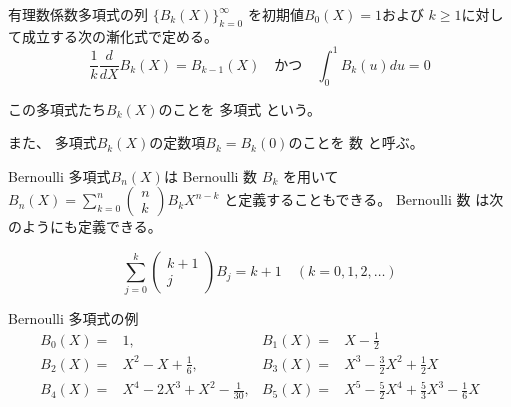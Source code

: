 \documentclass[12pt,b5paper]{ltjsarticle}
\begin{document}
有理数係数多項式の列
$\{ B_{k}(X) \}_{k=0}^{\infty}$
を初期値$B_{0}(X)=1$および
$k\geq 1$に対して成立する次の漸化式で定める。
\begin{equation}
 \frac{1}{k}\frac{d}{dX}B_{k}(X) = B_{k-1}(X)
  \quad かつ \quad
  \int_{0}^{1} B_{k}(u)du=0
\end{equation}

この多項式たち$B_{k}(X)$のことを
 多項式
という。

また、
多項式$B_{k}(X)$の定数項$B_{k}=B_{k}(0)$のことを
 数
と呼ぶ。


Bernoulli 多項式$B_{n}(X)$は
Bernoulli 数
$B_{k}$
を用いて
$B_{n}(X) = \sum_{k=0}^{n}\begin{pmatrix}n \\ k\end{pmatrix}B_{k}X^{n-k}$
と定義することもできる。
Bernoulli 数 は次のようにも定義できる。

\begin{equation}
 \sum_{j=0}^{k} \begin{pmatrix}k+1 \\ j\end{pmatrix} B_{j}
 = k+1
  \quad (k=0,1,2,\dots)
\end{equation}


Bernoulli 多項式の例
\begin{align}
 B_{0}(X)=& 1,
   & B_{1}(X)=& X-\frac{1}{2}\\
 B_{2}(X)=& X^{2}-X+\frac{1}{6},
   & B_{3}(X)=& X^{3}-\frac{3}{2}X^{2}+\frac{1}{2}X\\
 B_{4}(X)=& X^{4}-2X^{3}+X^{2}-\frac{1}{30},
 & B_{5}(X)=& X^{5}-\frac{5}{2}X^{4}+\frac{5}{3}X^{3}-\frac{1}{6}X
\end{align}

\hrulefill
\end{document}
